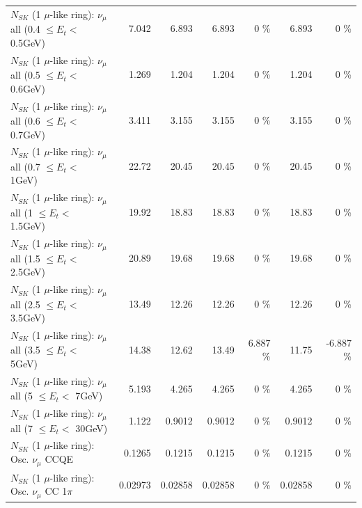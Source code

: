 \begin{table}
\begin{tabular}{| l | r | r | r  r | r  r |}
       $N_{SK}$ (1 $\mu$-like ring): $\nu_{\mu}$ all (0.4 $\leq E_{t} <$ 0.5GeV) &           7.042 &           6.893 &           6.893 &        0 \%  &           6.893 &        0 \%  \\ 
       $N_{SK}$ (1 $\mu$-like ring): $\nu_{\mu}$ all (0.5 $\leq E_{t} <$ 0.6GeV) &           1.269 &           1.204 &           1.204 &        0 \%  &           1.204 &        0 \%  \\ 
       $N_{SK}$ (1 $\mu$-like ring): $\nu_{\mu}$ all (0.6 $\leq E_{t} <$ 0.7GeV) &           3.411 &           3.155 &           3.155 &        0 \%  &           3.155 &        0 \%  \\ 
         $N_{SK}$ (1 $\mu$-like ring): $\nu_{\mu}$ all (0.7 $\leq E_{t} <$ 1GeV) &           22.72 &           20.45 &           20.45 &        0 \%  &           20.45 &        0 \%  \\ 
         $N_{SK}$ (1 $\mu$-like ring): $\nu_{\mu}$ all (1 $\leq E_{t} <$ 1.5GeV) &           19.92 &           18.83 &           18.83 &        0 \%  &           18.83 &        0 \%  \\ 
       $N_{SK}$ (1 $\mu$-like ring): $\nu_{\mu}$ all (1.5 $\leq E_{t} <$ 2.5GeV) &           20.89 &           19.68 &           19.68 &        0 \%  &           19.68 &        0 \%  \\ 
       $N_{SK}$ (1 $\mu$-like ring): $\nu_{\mu}$ all (2.5 $\leq E_{t} <$ 3.5GeV) &           13.49 &           12.26 &           12.26 &        0 \%  &           12.26 &        0 \%  \\ 
         $N_{SK}$ (1 $\mu$-like ring): $\nu_{\mu}$ all (3.5 $\leq E_{t} <$ 5GeV) &           14.38 &           12.62 &           13.49 &    6.887 \%  &           11.75 &   -6.887 \%  \\ 
           $N_{SK}$ (1 $\mu$-like ring): $\nu_{\mu}$ all (5 $\leq E_{t} <$ 7GeV) &           5.193 &           4.265 &           4.265 &        0 \%  &           4.265 &        0 \%  \\ 
          $N_{SK}$ (1 $\mu$-like ring): $\nu_{\mu}$ all (7 $\leq E_{t} <$ 30GeV) &           1.122 &          0.9012 &          0.9012 &        0 \%  &          0.9012 &        0 \%  \\ 
\hline
\hline
                               $N_{SK}$ (1 $\mu$-like ring): Osc. $\nu_\mu$ CCQE &          0.1265 &          0.1215 &          0.1215 &        0 \%  &          0.1215 &        0 \%  \\ 
                          $N_{SK}$ (1 $\mu$-like ring): Osc. $\nu_\mu$ CC 1$\pi$ &         0.02973 &         0.02858 &         0.02858 &        0 \%  &         0.02858 &        0 \%  \\ 

\end{tabular}
\end{table}
